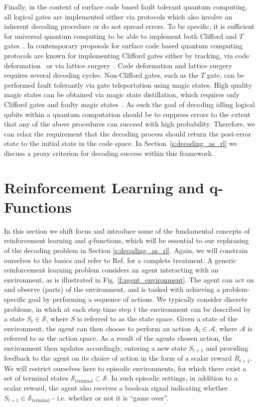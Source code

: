 \documentclass[twocolumn,preprintnumbers,amsmath,amssymb,notitlepage,nofootinbib,longbibliography,superscriptaddress,aps,pra,10pt]{revtex4-1}
\begin{document}
	Finally, in the context of surface code based fault tolerant quantum computing, all logical gates are implemented either via protocols which also involve an inherent decoding procedure or do not spread errors.
	To be specific, it is sufficient for universal quantum computing to be able to implement both Clifford and $T$ gates~\cite{Nebe01,Bravyi05}.
	In contemporary proposals for surface code based quantum computing~\cite{Litinski18b,Fowler18} protocols are known for implementing Clifford gates either by tracking, via code deformation~\cite{Brown17} or via lattice surgery~\cite{Horsman12,Litinski18}.
	Code deformation and lattice surgery requires several decoding cycles.
	Non-Clifford gates, such as the $T$ gate, can be performed fault tolerantly via gate teleportation using magic states.
	High quality magic states can be obtained via magic state distillation, which requires only Clifford gates and faulty magic states~\cite{Bravyi05}.
	As such the goal of decoding idling logical qubits within a quantum computation should be to suppress errors to the extent that any of the above procedures can succeed with high probability.
	Therefore, we can relax the requirement that the decoding process should return the post-error state to the initial state in the code space.
	In Section~\ref{s:decoding_as_rl} we discuss a proxy criterion for decoding success within this framework.

\section{Reinforcement Learning and q-Functions}\label{s:reinforcement_learning}

	In this section we shift focus and introduce some of the fundamental concepts of reinforcement learning and $q$-functions, which will be essential to our rephrasing of the decoding problem in Section \ref{s:decoding_as_rl}.
	Again, we will constrain ourselves to the basics and refer to Ref. \cite{RLSutton18} for a complete treatment.
	A generic reinforcement learning problem considers an agent interacting with an environment, as is illustrated in Fig. \ref{f:agent_environment}.
	The agent can act on and observe (parts) of the environment, and is tasked with achieving a problem-specific goal by performing a sequence of actions. 
	We typically consider discrete problems, in  which at each step time step $t$ the environment can be described by a state $S_t \in \mathcal{S}$, where $S$ is referred to as the state space.
	Given a state of the environment, the agent can then choose to perform an action $A_t \in \mathcal{A}$, where $\mathcal{A}$ is referred to as the action space.
	As a result of the agents chosen action, the environment then updates accordingly, entering a new state $S_{t+1}$ and providing feedback to the agent on its choice of action in the form of a scalar reward $R_{t+1}$.
	We will restrict ourselves here to episodic environments, for which there exist a set of terminal states $\mathcal{S}_{\mathrm{terminal}} \subset \mathcal{S}$.
	In such episodic settings, in addition to a scalar reward, the agent also receives a boolean signal indicating whether $S_{t+1} \in \mathcal{S}_{\mathrm{terminal}} $ - i.e. whether or not it is ``game over''.
\end{document}
